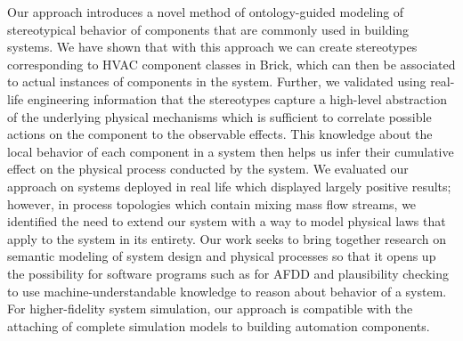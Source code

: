 \documentclass[sigconf]{acmart}
\begin{document}
Our approach introduces a novel method of ontology-guided modeling of stereotypical behavior of components that are commonly used in building systems.
We have shown that with this approach we can create stereotypes corresponding to HVAC component classes in Brick, which can then be associated to actual instances of components in the system.
Further, we validated using real-life engineering information that the stereotypes capture a high-level abstraction of the underlying physical mechanisms which is sufficient to correlate possible actions on the component to the observable effects.
This knowledge about the local behavior of each component in a system then helps us infer their cumulative effect on the physical process conducted by the system.
We evaluated our approach on systems deployed in real life which displayed largely positive results; however, in process topologies which contain mixing mass flow streams, we identified the need to extend our system with a way to model physical laws that apply to the system in its entirety.
%
Our work seeks to bring together research on semantic modeling of system design and physical processes so that it opens up the possibility for software programs such as for AFDD and plausibility checking to use machine-understandable knowledge to reason about behavior of a system. For higher-fidelity system simulation, our approach is compatible with the attaching of complete simulation models to building automation components.




\end{document}

